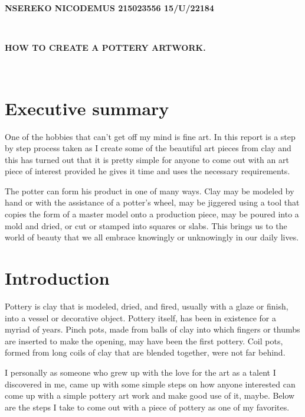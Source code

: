 \documentclass{article}
\begin{document}
\begin {small} \center \textbf{NSEREKO NICODEMUS    215023556     15/U/22184 }\end{small}\\

\begin{Large}\textbf{HOW TO CREATE A POTTERY ARTWORK.}\end{Large}\\
\section{Executive summary}{ 
One of the hobbies that can’t get off my mind is fine art. In this report is a step by step process taken as I create some of the beautiful art pieces from clay and this has turned out that it is pretty simple for anyone to come out with an art piece of interest provided he gives it time and uses the necessary requirements.}
{ 

The potter can form his product in one of many ways. Clay may be modeled by hand or with the assistance of a potter's wheel, may be jiggered using a tool that copies the form of a master model onto a production piece, may be poured into a mold and dried, or cut or stamped into squares or slabs. This brings us to the world of beauty that we all embrace knowingly or unknowingly in our daily lives.}
\section{Introduction}{
Pottery is clay that is modeled, dried, and fired, usually with a glaze or finish, into a vessel or decorative object. Pottery itself, has been in existence for a myriad of years. Pinch pots, made from balls of clay into which fingers or thumbs are inserted to make the opening, may have been the first pottery. Coil pots, formed from long coils of clay that are blended together, were not far behind.}
{

I personally as someone who grew up with the love for the art as a talent I discovered in me, came up with some simple steps on how anyone interested can come up with a simple pottery art work and make good use of it, maybe. Below are the steps I take to come out with a piece of pottery as one of my favorites.
}
\end{document}
